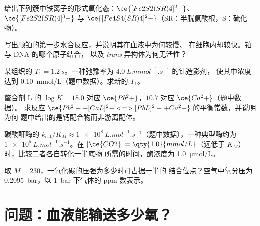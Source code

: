 \begin{exercise}[$\star\star$]\label{exo:b3:bioinorganic:7}
给出下列簇中铁离子的形式氧化态：$\ce{[Fe2S2(SR)4]^2-}$、
$\ce{[Fe2S2(SR)4]^3-}$ 与 $\ce{[Fe4S4(SR)4]^2-}$（SR：半胱氨酸根，S：硫化物）。
\end{exercise}

\begin{exercise}[$\star\star$]\label{exo:b3:bioinorganic:8}
写出顺铂的第一步水合反应，并说明其在血液中为何较慢、
在细胞内却较快。铂与 DNA 的哪个原子结合，
以及 \textit{trans} 异构体为何无活性？
\end{exercise}

\begin{exercise}[$\star\star$]\label{exo:b3:bioinorganic:9}
某组织的 $T_1 = \qty{1.2}{s}$。一种弛豫率为 $\qty{4.0}{L.mmol^{-1}.s^{-1}}$ 的钆造影剂，
使其中浓度达到 \qty{0.10}{mmol/L}（题中数据）。求新的 $T_1$。
\end{exercise}

\begin{exercise}[$\star\star\star$]\label{exo:b3:bioinorganic:10}
螯合剂 L 的 $\log K = 18.0$ 对应 $\ce{Pb^2+}$，$10.7$ 对应 $\ce{Ca^2+}$（题中数据）。
求反应 $\ce{Pb^2+ + [CaL]^2- <=> [PbL]^2- + Ca^2+}$ 的平衡常数，并说明为何
题中给出的是钙配合物而非游离配体。
\end{exercise}

\begin{exercise}[$\star\star\star$]\label{exo:b3:bioinorganic:11}
碳酸酐酶的 $k_{\mathrm{cat}}/K_M \approx \qty{1e8}{L.mol^{-1}.s^{-1}}$（题中数据），一种典型酶约为
$\qty{1e5}{L.mol^{-1}.s^{-1}}$。在 $[\ce{CO2}] = \qty{1.0}{mmol/L}$（远低于 $K_M$）时，比较二者各自转化一半底物
所需的时间，酶浓度为 \qty{1.0}{\micro mol/L}。
\end{exercise}

\begin{exercise}[$\star\star\star$]\label{exo:b3:bioinorganic:12}
取 $M = 230$，一氧化碳的压强为多少时可占据一半的
结合位点？空气中氧分压为 \qty{0.2095}{bar}，以 \qty{1}{bar} 下气体的 ppm 数表示。
\end{exercise}

\section{问题：血液能输送多少氧？}

